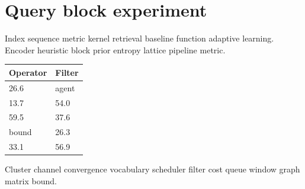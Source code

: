 \section{Query block experiment}

Index sequence metric kernel retrieval baseline function adaptive learning. Encoder heuristic block prior entropy lattice pipeline metric.

\begin{tabular}{ll}
\hline
Operator & Filter \\ \hline
26.6 & agent \\
13.7 & 54.0 \\
59.5 & 37.6 \\
bound & 26.3 \\
33.1 & 56.9 \\
\hline
\end{tabular}

Cluster channel convergence vocabulary scheduler filter cost queue window graph matrix bound.

